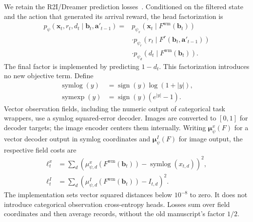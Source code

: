 \documentclass{article}
\begin{document}
We retain the R2I/Dreamer prediction losses~\cite{samsami2024mastering,hafner2023mastering}. Conditioned on the filtered state and the action that generated its arrival reward, the head factorization is
\begin{equation}
\begin{split}
p_\psi(\mathbf x_t,r_t,d_t\mid\mathbf b_t,\mathbf a'_{t-1})={}&
p_{\psi_x}(\mathbf x_t\mid F^{\mathrm{wm}}(\mathbf b_t))\\
&\cdot p_{\psi_r}(r_t\mid F^r(\mathbf b_t,\mathbf a'_{t-1}))\\
&\cdot p_{\psi_d}(d_t\mid F^{\mathrm{wm}}(\mathbf b_t)).
\end{split}
\label{eq:prediction_factorization}
\end{equation}
The final factor is implemented by predicting $1-d_t$. This factorization introduces no new objective term. Define
\begin{equation}
\begin{aligned}
\operatorname{symlog}(y)&=\operatorname{sign}(y)\log(1+|y|),\\
\operatorname{symexp}(y)&=\operatorname{sign}(y)(e^{|y|}-1).
\end{aligned}
\label{eq:symlog}
\end{equation}
Vector observation fields, including the numeric output of categorical task wrappers, use a symlog squared-error decoder. Images are converted to $[0,1]$ for decoder targets; the image encoder centers them internally. Writing $\boldsymbol\mu^x_\psi(F)$ for a vector decoder output in symlog coordinates and $\boldsymbol\mu^I_\psi(F)$ for image output, the respective field costs are
\begin{align}
\ell_t^{x}&=\sum_d \left(\mu^x_{\psi,d}(F^{\mathrm{wm}}(\mathbf b_t))-
\operatorname{symlog}(x_{t,d})\right)^2,
\label{eq:nrsm_observation_loss}\\
\ell_t^{I}&=\sum_d\left(\mu^I_{\psi,d}(F^{\mathrm{wm}}(\mathbf b_t))-I_{t,d}\right)^2.
\label{eq:nrsm_image_loss}
\end{align}
The implementation sets vector squared distances below $10^{-8}$ to zero. It does not introduce categorical observation cross-entropy heads. Losses sum over field coordinates and then average records, without the old manuscript's factor $1/2$.
\end{document}
